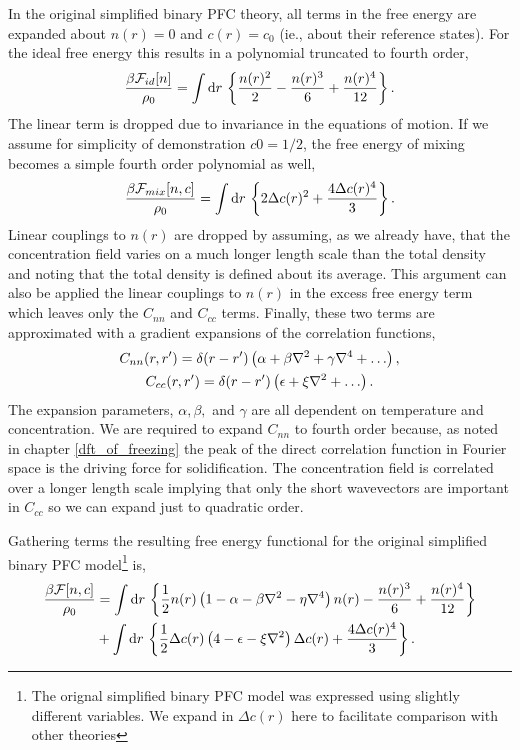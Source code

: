 In the original simplified binary PFC theory, all terms in the free energy are
expanded about $n(r) = 0$ and $c(r) = c_0$ (ie., about their reference states).
For the ideal free energy this results in a polynomial truncated to fourth
order,
%
\begin{equation}
    \label{ideal_expansion}
    \frac{\beta\mathcal{F}_{id}[n]}{\rho_0} = \int \mathrm{d}r\,
    \left\lbrace \frac{n(r)^2}{2} - \frac{n(r)^3}{6} + \frac{n(r)^4}{12} \right\rbrace.
\end{equation}
%
The linear term is dropped due to invariance in the equations of motion. If we
assume for simplicity of demonstration $c0 = 1/2$, the free energy of mixing
becomes a simple fourth order polynomial as well,
%
\begin{equation}
    \frac{\beta\mathcal{F}_{mix}[n, c]}{\rho_0} = \int \mathrm{d}r\, \left\lbrace
       2\Delta c(r)^2 + \frac{4\Delta c(r)^4}{3}
    \right\rbrace.
\end{equation}
%
Linear couplings to $n(r)$ are dropped by assuming, as we already have, that
the concentration field varies on a much longer length scale than the total
density and noting that the total density is defined about its average. This
argument can also be applied the linear couplings to $n(r)$ in the excess free
energy term which leaves only the $C_{nn}$ and $C_{cc}$ terms. Finally, these
two terms are approximated with a gradient expansions of the correlation
functions,
%
\begin{gather}
    C_{nn}(r, r^\prime) = \d(r - r^\prime)\l(
        \alpha + \beta \nabla^2 + \gamma \nabla^4 + \dots\r), \\
    C_{cc}(r, r^\prime) = \d(r - r^\prime)\l(
        \epsilon + \xi \nabla^2 + \dots\r).
\end{gather}
%
The expansion parameters, $\alpha, \beta,$ and $\gamma$ are all dependent on
temperature and concentration. We are required to expand $C_{nn}$ to fourth
order because, as noted in chapter \ref{dft_of_freezing} the peak of the direct
correlation function in Fourier space is the driving force for solidification.
The concentration field is correlated over a longer length scale implying that
only the short wavevectors are important in $C_{cc}$ so we can expand just to
quadratic order.

Gathering terms the resulting free energy functional for the original simplified
binary PFC model\footnote{The orignal simplified binary PFC model was
expressed using slightly different variables. We expand in $\Delta c(r)$ here to 
facilitate comparison with other theories} is,
%
\begin{align}
    \frac{\beta\mathcal{F}[n, c]}{\rho_0} &= \int \mathrm{d}r\, \left\lbrace 
        \frac{1}{2} n(r) \left( 1 - \alpha - \beta\nabla^2 - \eta\nabla^4 \right) n(r)
      - \frac{n(r)^3}{6} + \frac{n(r)^4}{12} \right\rbrace \\
    &+ \int \mathrm{d}r\, \left\lbrace
        \frac{1}{2} \Delta c(r) \left( 4 - \epsilon - \xi\nabla^2 \right) \Delta c(r) 
      + \frac{4 \Delta c(r)^4}{3} \right\rbrace. \nonumber
\end{align}
%

